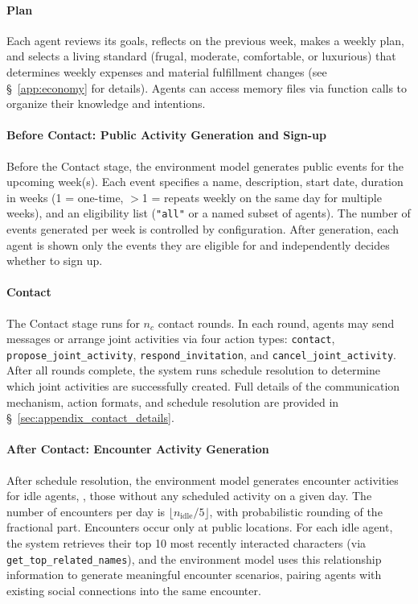 \paragraph{Plan}
Each agent reviews its goals, reflects on the previous week, makes a weekly plan, and selects a living standard (frugal, moderate, comfortable, or luxurious) that determines weekly expenses and material fulfillment changes (see \S~\ref{app:economy} for details).
Agents can access memory files via function calls to organize their knowledge and intentions.

\paragraph{Before Contact: Public Activity Generation and Sign-up}
Before the Contact stage, the environment model generates public events for the upcoming week(s).
Each event specifies a name, description, start date, duration in weeks (1 = one-time, $>$1 = repeats weekly on the same day for multiple weeks), and an eligibility list (\texttt{"all"} or a named subset of agents).
The number of events generated per week is controlled by configuration.
After generation, each agent is shown only the events they are eligible for and independently decides whether to sign up.

\paragraph{Contact}
The Contact stage runs for $n_c$ contact rounds.
In each round, agents may send messages or arrange joint activities via four action types: \texttt{contact},
\texttt{propose\_joint\_activity}, \texttt{respond\_invitation}, and \texttt{cancel\_joint\_activity}.
After all rounds complete, the system runs schedule resolution to determine which joint activities are
successfully created.
Full details of the communication mechanism, action formats, and schedule resolution are provided in
\S~\ref{sec:appendix_contact_details}.


\paragraph{After Contact: Encounter Activity Generation}
After schedule resolution, the environment model generates encounter activities for idle agents, \ie, those without any scheduled activity on a given day.
The number of encounters per day is $\lfloor n_{\text{idle}} / 5 \rfloor$, with probabilistic rounding of the fractional part.
Encounters occur only at public locations.
For each idle agent, the system retrieves their top 10 most recently interacted characters (via \texttt{get\_top\_related\_names}), and the environment model uses this relationship information to generate meaningful encounter scenarios, pairing agents with existing social connections into the same encounter.

